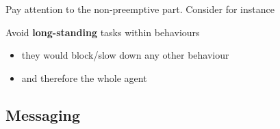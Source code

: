 \documentclass{beamer}\mode<presentation>{\usetheme{AMSCesenaPurpleAndGold}}
\begin{document}
\begin{frame}[allowframebreaks]
    \framebreak

    Pay attention to the \alert{non-preemptive} part. Consider for instance
    

    \bigskip

    \begin{alertblock}{Avoid \textbf{long-standing} tasks within behaviours}
        \begin{itemize}
            \item they would block/slow down any other behaviour
            \item and therefore the whole agent
        \end{itemize}
    \end{alertblock}

\end{frame}

\subsection{\jade{} Messaging}
\end{document}
